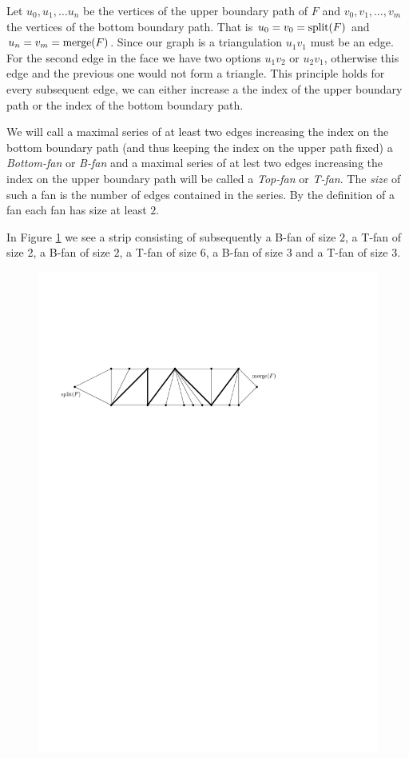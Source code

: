  Let $u_0 , u_1, \ldots u_n$ be the vertices of the upper boundary path of $F$ and $v_0, v_1, \ldots, v_m$ the vertices of the bottom boundary path. That is $u_0=v_0 = \operatorname{split}(F)$ and $u_n = v_m = \operatorname{merge}(F)$. Since our graph is a triangulation $u_1v_1$ must be an edge. For the second edge in the face we have two options $u_1v_2$ or $u_2v_1$, otherwise this edge and the previous one would not form a triangle. This principle holds for every subsequent edge, we can either increase a the index of the upper boundary path or the index of the bottom boundary path.

 We will call a maximal series of at least two edges increasing the index on the bottom boundary path (and thus keeping the index on the upper path fixed) a \emph{Bottom-fan} or \emph{B-fan} and a maximal series of at lest two edges increasing the index on the upper boundary path will be called a \emph{Top-fan} or \emph{T-fan}. The \emph{size} of such a fan is the number of edges contained in the series. By the definition of a fan each fan has size at least $2$.

 In Figure \ref{fig:uni:fans} we see a strip consisting of subsequently a B-fan of size $2$, a T-fan of size 2, a B-fan of size $2$, a T-fan of size $6$, a B-fan of size $3$ and a T-fan of size $3$.

 \begin{figure}[h]
   \centering
   \includegraphics[scale=.9]{unifiedAlgo/img/fans}
   \caption{}
   \label{fig:uni:fans}
 \end{figure}


